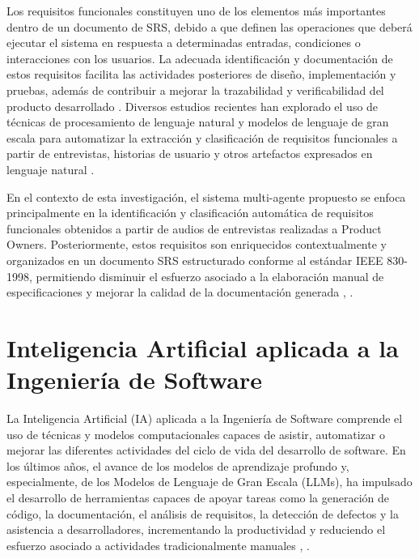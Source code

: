 Los requisitos funcionales constituyen uno de los elementos más importantes dentro de un documento de 
SRS, debido a que definen las operaciones que deberá ejecutar el sistema en respuesta a determinadas entradas, condiciones o interacciones con 
los usuarios. La adecuada identificación y documentación de estos requisitos facilita las actividades posteriores de diseño, implementación y pruebas, 
además de contribuir a mejorar la trazabilidad y verificabilidad del producto desarrollado \cite{Akhtar2025}. Diversos estudios recientes han explorado el uso de 
técnicas de procesamiento de lenguaje natural y modelos de lenguaje de gran escala para automatizar la extracción y clasificación de requisitos 
funcionales a partir de entrevistas, historias de usuario y otros artefactos expresados en lenguaje natural \cite{Rahman2024}.

En el contexto de esta investigación, el sistema multi-agente propuesto se enfoca principalmente en la identificación y clasificación automática de 
requisitos funcionales obtenidos a partir de audios de entrevistas realizadas a Product Owners. Posteriormente, estos requisitos son enriquecidos 
contextualmente y organizados en un documento SRS estructurado conforme al estándar IEEE 830-1998, permitiendo disminuir el esfuerzo asociado a la 
elaboración manual de especificaciones y mejorar la calidad de la documentación generada \cite{Umar2024}, \cite{Mukaida2025}.






\section{Inteligencia Artificial aplicada a la Ingeniería de Software }

La Inteligencia Artificial (IA) aplicada a la Ingeniería de Software comprende el uso de técnicas y modelos computacionales capaces de asistir, 
automatizar o mejorar las diferentes actividades del ciclo de vida del desarrollo de software. En los últimos años, el avance de los modelos de 
aprendizaje profundo y, especialmente, de los Modelos de Lenguaje de Gran Escala (LLMs), ha impulsado el desarrollo de herramientas capaces de apoyar 
tareas como la generación de código, la documentación, el análisis de requisitos, la detección de defectos y la asistencia a desarrolladores, 
incrementando la productividad y reduciendo el esfuerzo asociado a actividades tradicionalmente manuales \cite{Umar2024}, \cite{Wolf2026}.

